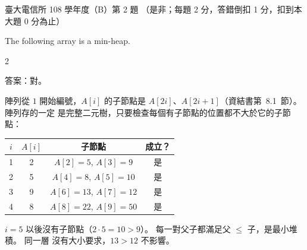 \begin{pastexam}[label={px:ntu-108-comm-dsab-02}]{臺大電信所 108 學年度（B）第 2 題}
（是非；每題 2 分，答錯倒扣 1 分，扣到本大題 0 分為止）

The following array is a min-heap.
\begin{center}2\end{center}
\end{pastexam}

\begin{pastsoln}
答案：對。

陣列從 $1$ 開始編號，$A[i]$ 的子節點是 $A[2i]$、$A[2i + 1]$（資結書第~8.1~節）。 陣列存的一定
是完整二元樹，只要檢查每個有子節點的位置都不大於它的子節點：
\begin{center}
\begin{tabular}{cccc}
\toprule
$i$ & $A[i]$ & 子節點 & 成立？ \\
\midrule
1 & 2 & $A[2] = 5$, $A[3] = 9$ & 是 \\
2 & 5 & $A[4] = 8$, $A[5] = 10$ & 是 \\
3 & 9 & $A[6] = 13$, $A[7] = 12$ & 是 \\
4 & 8 & $A[8] = 22$, $A[9] = 50$ & 是 \\
\bottomrule
\end{tabular}
\end{center}
$i = 5$ 以後沒有子節點（$2 \cdot 5 = 10 > 9$）。 每一對父子都滿足父 $\le$ 子，是最小堆積。 同一層
沒有大小要求，$13 > 12$ 不影響。
\end{pastsoln}
